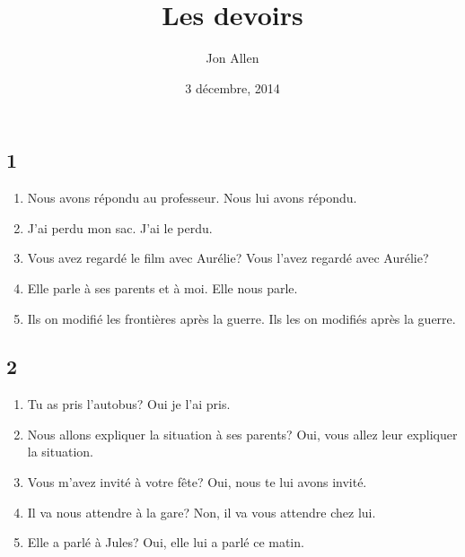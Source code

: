 \documentclass[letterpaper]{article}
\begin{document}
\title{Les devoirs}
\date{3 décembre, 2014}
\author{Jon Allen}
\maketitle
\subsection*{1}
\begin{spacing}{2.85}
\begin{enumerate}
\item
Nous avons répondu au professeur.  
Nous lui avons répondu.
\item
J'ai perdu mon sac.  
J'ai le perdu.
\item
Vous avez regardé le film avec Aurélie?
Vous l'avez regardé avec Aurélie?
\item
Elle parle à ses parents et à moi. Elle nous parle.
\item
Ils on modifié les frontières après la guerre. Ils les on modifiés après la guerre.
\end{enumerate}
\end{spacing}
\subsection*{2}
\begin{spacing}{2.85}
\begin{enumerate}
\item
Tu as pris l'autobus? Oui je l'ai pris.
\item
Nous allons expliquer la situation à ses parents? Oui, vous allez leur expliquer la situation.
\item
Vous m'avez invité à votre fête?
Oui, nous te lui avons invité.
\item
Il va nous attendre à la gare?
Non, il va vous attendre chez lui.
\item
Elle a parlé à Jules?
Oui, elle lui a parlé ce matin.
\end{enumerate}
\end{spacing}
\end{document}
